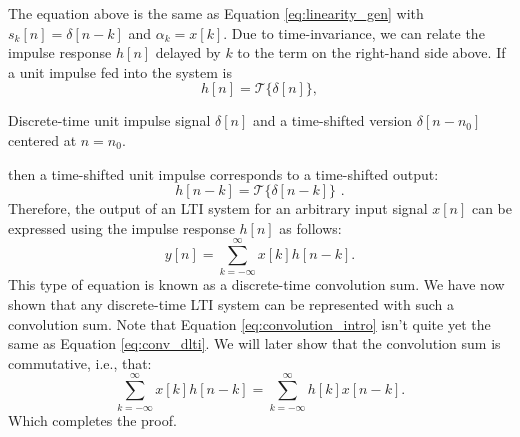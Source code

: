 \fi
\noindent The equation above is the same as Equation \ref{eq:linearity_gen} with $s_k[n] = \delta[n-k]$ and $\alpha_k=x[k]$.  Due to time-invariance,
we can relate the impulse response $h[n]$ delayed by $k$ to the term
on the right-hand side above. If a unit impulse fed into the system is
\begin{equation}
h[n] = \mathcal{T}\{\delta[n]\},
\end{equation}
\begin{marginfigure}
  \begin{center}
  \end{center}
  \caption{Discrete-time unit impulse signal $\delta[n]$ and a time-shifted version $\delta[n-n_0]$ centered at $n=n_0$.}
  \label{fig:dt_unit_impulse}
\end{marginfigure}
then a time-shifted unit impulse corresponds to a time-shifted output:
\begin{equation}
h[n-k] = \mathcal{T}\{\delta[n-k]\}\,\,.
\end{equation}
Therefore, the output of an LTI system for an arbitrary input signal
$x[n]$ can be expressed using the impulse response $h[n]$ as follows:
\begin{equation}
  y[n] = \sum_{k=-\infty}^{\infty} x[k]h[n-k].
  \label{eq:convolution_intro}
\end{equation}
This type of equation is known as a discrete-time convolution sum. We have now shown that any discrete-time LTI system can be represented with such a convolution sum. 
Note that Equation \ref{eq:convolution_intro} isn't quite yet the same as Equation \ref{eq:conv_dlti}. We will later show that the convolution sum is commutative, i.e., that:
\begin{equation}
 \sum_{k=-\infty}^{\infty} x[k]h[n-k] = \sum_{k=-\infty}^{\infty} h[k]x[n-k].
\end{equation}
Which completes the proof.

